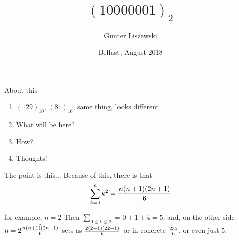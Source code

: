 \documentclass[pdf]{beamer}
\title{$(10000001)_2$}
\author{Gunter Liszewski}
\date{Belfast, August 2018}
\begin{document}
\begin{frame}
  \titlepage
\end{frame}


\begin{frame}{About this}

  \begin{enumerate}[A]
    \pause
    \item $(129)_{10}$, $(81)_{16}$, same thing, looks different
    \pause
    \item What will be here?
    \pause
    \item How?
    \pause
    \item Thoughts!
  \end{enumerate}
\end{frame}

\begin{frame}{The point is this...}
  Because of this, there is that
$$\sum_{k=0}^{n}{k^2}={n(n+1)(2n+1)\over 6}$$
\end{frame}


\begin{frame}{for example, $n=2$}
  Then $\sum_{0\le k\le2}=0+1+4=5$, and, on the other side $n=2\hat{n(n+1)(2n+1)\over 6}$
sets as ${2(2+1)(2 2+1)\over 6}$ or in concrete $2 3 5\over6$, or even just $5$.
\end{frame}
\end{document}
